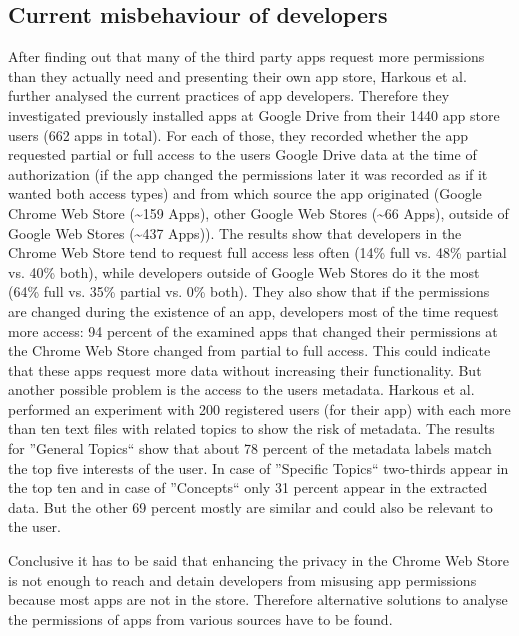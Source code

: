 \documentclass[11pt,twocolumn,a4paper,DIV=calc]{scrartcl}
\begin{document}
\subsection{Current misbehaviour of developers}
After finding out that many of the third party apps request more permissions than they actually need and presenting their own app store, Harkous et al. further analysed the current practices of app developers. Therefore they investigated previously installed apps at Google Drive from their 1440 app store users (662 apps in total). For each of those, they recorded whether the app requested partial or full access to the users Google Drive data at the time of authorization (if the app changed the permissions later it was recorded as if it wanted both access types) and from which source the app originated (Google Chrome Web Store (\textasciitilde 159 Apps), other Google Web Stores (\textasciitilde 66 Apps), outside of Google Web Stores (\textasciitilde 437 Apps)). 
The results show that developers in the Chrome Web Store tend to request full access less often (14\% full vs. 48\% partial vs. 40\% both), while developers outside of Google Web Stores do it the most (64\% full vs. 35\% partial vs. 0\% both). They also show that if the permissions are changed during the existence of an app, developers most of the time request more access: 94 percent of the examined apps that changed their permissions at the Chrome Web Store changed from partial to full access. This could indicate that these apps request more data without increasing their functionality. But another possible problem is the access to the users metadata. Harkous et al. performed an experiment with 200 registered users (for their app) with each more than ten text files with related topics to show the risk of metadata. The results for ''General Topics`` show that about 78 percent of the metadata labels match the top five interests of the user. In case of ''Specific Topics`` two-thirds appear in the top ten and in case of ''Concepts`` only 31 percent appear in the extracted data. But the other 69 percent mostly are similar and could also be relevant to the user. 

Conclusive it has to be said that enhancing the privacy in the Chrome Web Store is not enough to reach and detain developers from misusing app permissions because most apps are not in the store. Therefore alternative solutions to analyse the permissions of apps from various sources have to be found.  
\end{document}
